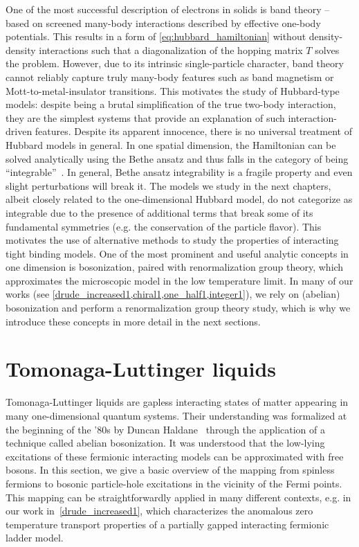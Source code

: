 One of the most successful description of electrons in solids is band theory -- based on screened many-body interactions described by effective one-body potentials.
This results in a form of \cref{eq:hubbard_hamiltonian} without density-density interactions such that a diagonalization of the hopping matrix $T$ solves the problem.
However, due to its intrinsic single-particle character, band theory cannot reliably capture truly many-body features such as band magnetism or Mott-to-metal-insulator transitions.
This motivates the study of Hubbard-type models: despite being a brutal simplification of the true two-body interaction, they are the simplest systems that provide an explanation of such interaction-driven features.
Despite its apparent innocence, there is no universal treatment of Hubbard models in general.
In one spatial dimension, the Hamiltonian can be solved analytically using the Bethe ansatz and thus falls in the category of being ``integrable''~\cite{Essler2005}.
In general, Bethe ansatz integrability is a fragile property and even slight perturbations will break it.
The models we study in the next chapters, albeit closely related to the one-dimensional Hubbard model, do not categorize as integrable due to the presence of additional terms that break some of its fundamental symmetries (e.g. the conservation of the particle flavor).
This motivates the use of alternative methods to study the properties of interacting tight binding models.
One of the most prominent and useful analytic concepts in one dimension is bosonization, paired with renormalization group theory, which approximates the microscopic model in the low temperature limit.
In many of our works (see \cref{drude_increased1,chiral1,one_half1,integer1}), we rely on (abelian) bosonization and perform a renormalization group theory study, which is why we introduce these concepts in more detail in the next sections.
%
%
\section{Tomonaga-Luttinger liquids}
\label{sec:tomonaga_LL}
Tomonaga-Luttinger liquids are gapless interacting states of matter appearing in many one-dimensional quantum systems.
Their understanding was formalized at the beginning of the '80s by Duncan Haldane~\cite{Haldane1981} through the application of a technique called abelian bosonization.
It was understood that the low-lying excitations of these fermionic interacting models can be approximated with free bosons.
In this section, we give a basic overview of the mapping from spinless fermions to bosonic particle-hole excitations in the vicinity of the Fermi points.
This mapping can be straightforwardly applied in many different contexts, e.g. in our work in~\cref{drude_increased1}, which characterizes the anomalous zero temperature transport properties of a partially gapped interacting fermionic ladder model.


